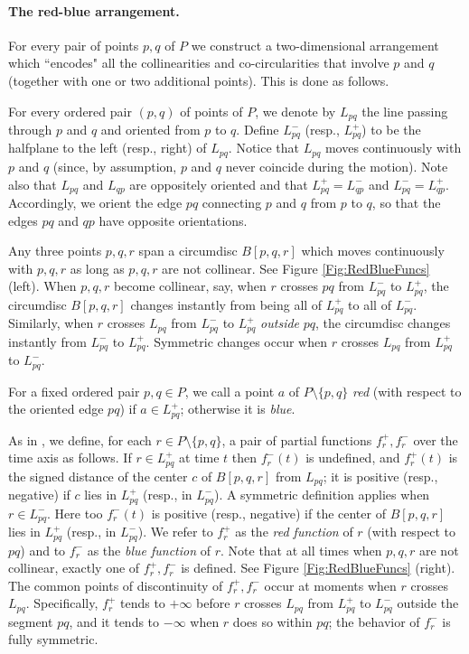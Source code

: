 \documentclass[letter,11pt]{article}
\def \L{{L}}
\begin{document}
\paragraph{The red-blue arrangement.} For every pair of points $p,q$ of $P$ we construct a two-dimensional arrangement which ``encodes" all the collinearities and co-circularities that involve $p$ and $q$ (together with one or two additional points). This is done as follows.

For every ordered pair $(p,q)$ of points of $P$, we
denote by $\L_{pq}$ the line passing through $p$ and $q$ and oriented from $p$ to $q$. 
Define $\L_{pq}^-$ (resp., $\L_{pq}^+$) to be the halfplane to the left (resp., right) of $\L_{pq}$.
Notice that $\L_{pq}$ moves continuously with $p$ and $q$ (since, by assumption, $p$ and $q$ never coincide during the motion). Note also that $\L_{pq}$ and $\L_{qp}$ are oppositely oriented and that $\L_{pq}^+=\L_{qp}^-$ and $\L_{pq}^-=\L_{qp}^+$.
Accordingly, we orient the edge $pq$ connecting $p$ and $q$ from $p$ to $q$, so that the edges $pq$ and $qp$ have opposite orientations.


Any three points $p,q,r$ span a circumdisc $B[p,q,r]$ which moves continuously with $p,q,r$ as long as $p,q,r$ are not collinear. See Figure \ref{Fig:RedBlueFuncs} (left). When $p,q,r$ become collinear, say, when $r$ crosses $pq$ from $\L_{pq}^-$ to $\L_{pq}^+$, the circumdisc $B[p,q,r]$ changes instantly from being all of $\L_{pq}^+$ to all of $\L_{pq}^-$.
Similarly, when $r$ crosses $\L_{pq}$ from $\L_{pq}^-$ to $\L_{pq}^+$ {\it outside} $pq$, the circumdisc changes instantly from $\L_{pq}^-$ to $\L_{pq}^+$. Symmetric changes occur when $r$ crosses $\L_{pq}$ from $\L_{pq}^+$ to $\L_{pq}^-$.

 
For a fixed ordered pair $p,q\in P$, we call a point $a$ of $P\setminus\{p,q\}$ {\it red} (with respect to the oriented edge $pq$) if $a\in \L_{pq}^+$; otherwise it is {\it blue}.

As in \cite{gmr-vdmpp-92}, we define, for each $r\in P\setminus\{p,q\}$, a pair of partial functions $f_r^+,f_r^-$ over the time axis as follows.
If $r\in \L_{pq}^+$ at time $t$ then $f_r^-(t)$ is undefined, and $f^+_r(t)$ is the signed distance of the center $c$ of $B[p,q,r]$ from $\L_{pq}$; it is positive (resp., negative) if $c$ lies in $\L_{pq}^+$ (resp., in $\L_{pq}^-$). A symmetric definition applies when $r\in \L_{pq}^-$. Here too $f^-_r(t)$ is positive (resp., negative) if the center of $B[p,q,r]$ lies in $\L_{pq}^+$ (resp., in $\L_{pq}^-$). We refer to $f_r^+$ as the {\it red function} of $r$ (with respect to $pq$) and to $f_r^-$ as the {\it blue function} of $r$. Note that at all times when $p,q,r$ are not collinear, exactly one of $f_r^+,f_r^-$ is defined. See Figure \ref{Fig:RedBlueFuncs} (right).
The common points of discontinuity of $f_r^+,f_r^-$ occur at moments when $r$ crosses $\L_{pq}$. Specifically, $f_r^+$ tends to $+\infty$ before $r$ crosses $\L_{pq}$ from $\L_{pq}^+$ to $\L_{pq}^-$ outside the segment $pq$, and it tends to $-\infty$ when $r$ does so within $pq$; the behavior of $f_r^-$ is fully symmetric. 
\end{document}
